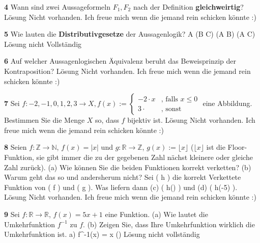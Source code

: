 \documentclass[11pt]{article}
\begin{document}
    \textbf{4} Wann sind zwei Aussageformeln $F_1, F_2$ nach der Definition \textbf{gleichweirtig}?\newline
    Lösung Nicht vorhanden. Ich freue mich wenn die jemand rein schicken könnte :)\newline

    \textbf{5} Wie lauten die \textbf{Distributivgesetze} der Aussagenlogik?\newline
    A \land (B \lor C) \iff (A \land B) \lor (A \land C)\newline
    Lösung nicht Vollständig\newline


\textbf{6} Auf welcher Aussagenlogischen Äquivalenz beruht das Beweisprinzip der Kontraposition?\newline
    Lösung Nicht vorhanden. Ich freue mich wenn die jemand rein schicken könnte :)\newline

    \textbf{7} Sei $f : {-2,-1,0,1,2,3} \rightarrow X, f(x) :=  \begin{cases}
                                                                    -2 \cdot x & \text{, falls $x \leq 0$} \\
                                                                    3 \cdot & \text{, sonst}
    \end{cases}$ eine Abbildung. Bestimmen Sie die Menge $X$ so, dass $f$ bijektiv ist.\newline
    Lösung Nicht vorhanden. Ich freue mich wenn die jemand rein schicken könnte :)\newline

    \textbf{8} Seien \( f : \mathbb{Z} \rightarrow \mathbb{N} \), \( f(x) = |x| \) und \( g : \mathbb{R} \rightarrow \mathbb{Z} \), \( g(x) := \lfloor x \rfloor \) (\(\lfloor x \rfloor\) ist die Floor-Funktion, sie gibt immer die zu der gegebenen Zahl nächst kleinere oder gleiche Zahl zurück).
    (a) Wie können Sie die beiden Funktionen korrekt verketten? (b) Warum geht das so und andersherum nicht?
    Sei ( h ) die korrekt Verkettete Funktion von ( f ) und ( g ). Was liefern dann (c) ( h(\pi) ) und (d) ( h(-5) ).\newline
    Lösung Nicht vorhanden. Ich freue mich wenn die jemand rein schicken könnte :)\newline

    \textbf{9} Sei \( f : \mathbb{R} \rightarrow \mathbb{R} \), \( f(x) = 5x + 1 \) eine Funktion. (a) Wie lautet die Umkehrfunktion $f^{-1}$ zu $f$. (b) Zeigen Sie, dass Ihre Umkehrfunktion wirklich die Umkehrfunktion ist.\newline
    a) f^{-1}(x) = x \cdot ()\newline
    Lösung nicht vollständig\newline
\end{document}
